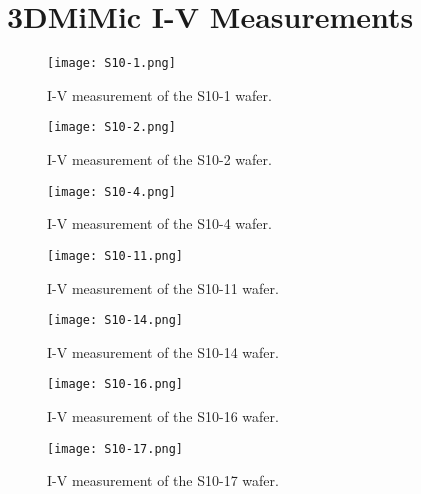 \documentclass[../main/thesis.tex]{subfiles}
\begin{document}
\chapter{3DMiMic I-V Measurements}
\label{a-iv}

\begin{figure}[h]
	\centering
	\texttt{[image: S10-1.png]}
	\caption{I-V measurement of the S10-1 wafer. }
	\label{fig-3d-S10-1} 
\end{figure}

\begin{figure}[b!]
	\centering
	\texttt{[image: S10-2.png]}
	\caption{I-V measurement of the S10-2 wafer. }
	\label{fig-3d-S10-2} 
\end{figure}

\begin{figure}%
	\centering
	\texttt{[image: S10-4.png]}
	\caption{I-V measurement of the S10-4 wafer. }
	\label{fig-3d-S10-4} 
\end{figure}

\begin{figure}%
	\centering
	\texttt{[image: S10-11.png]}
	\caption{I-V measurement of the S10-11 wafer. }
	\label{fig-3d-S10-11} 
\end{figure}

\begin{figure}%
	\centering
	\texttt{[image: S10-14.png]}
	\caption{I-V measurement of the S10-14 wafer. }
	\label{fig-3d-S10-14} 
\end{figure}

\begin{figure}%
	\centering
	\texttt{[image: S10-16.png]}
	\caption{I-V measurement of the S10-16 wafer. }
	\label{fig-3d-S10-16} 
\end{figure}

\begin{figure}%
	\centering
	\texttt{[image: S10-17.png]}
	\caption{I-V measurement of the S10-17 wafer. }
	\label{fig-3d-S10-17-} 
\end{figure}
\end{document}
